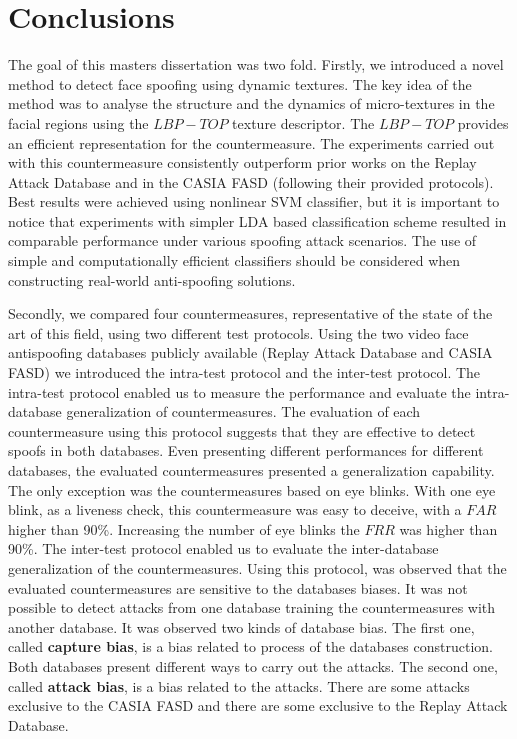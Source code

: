 \chapter{Conclusions}
\label{chap:Conclusions}

The goal of this masters dissertation was two fold. Firstly, we introduced a novel method to detect face spoofing using dynamic textures. The key idea of the method was to analyse the structure and the dynamics of micro-textures in the facial regions using the $LBP-TOP$ texture descriptor. The $LBP-TOP$ provides an efficient representation for the countermeasure. The experiments carried out with this countermeasure consistently outperform prior works on the Replay Attack Database and in the CASIA FASD (following their provided protocols). Best results were achieved using nonlinear SVM classifier, but it is important to notice that experiments with simpler LDA based classification scheme resulted in comparable performance under various spoofing attack scenarios. The use of simple and computationally efficient classifiers should be considered when constructing real-world anti-spoofing solutions.

Secondly, we compared four countermeasures, representative of the state of the art of this field, using two different test protocols. Using the two video face antispoofing databases publicly available (Replay Attack Database and CASIA FASD) we introduced the intra-test protocol and the inter-test protocol. The intra-test protocol enabled us to measure the performance and evaluate the intra-database generalization of countermeasures. The evaluation of each countermeasure using this protocol suggests that they are effective to detect spoofs in both databases. Even presenting different performances for different databases, the evaluated countermeasures presented a generalization capability. The only exception was the countermeasures based on eye blinks. With one eye blink, as a liveness check, this countermeasure was easy to deceive, with a $FAR$ higher than 90\%. Increasing the number of eye blinks the $FRR$ was higher than 90\%. The inter-test protocol enabled us to evaluate the inter-database generalization of the countermeasures. Using this protocol, was observed that the evaluated countermeasures are sensitive to the databases biases. It was not possible to detect attacks from one database training the countermeasures with another database. It was observed two kinds of database bias. The first one, called \textbf{capture bias}, is a bias related to process of the databases construction. Both databases present different ways to carry out the attacks. The second one, called \textbf{attack bias}, is a bias related to the attacks. There are some attacks exclusive to the CASIA FASD and there are some exclusive to the Replay Attack Database.

